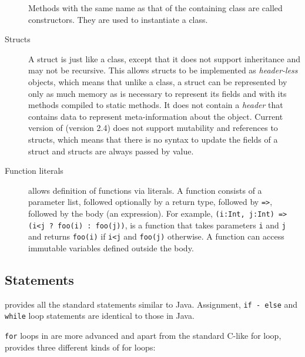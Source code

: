 \begin{description}
Methods with the same name as that of the containing class are called
constructors. They are used to instantiate a class. 

\item[Structs] A struct is just like a class, except that it does not support
inheritance and may not be recursive. This allows structs to be implemented as
\emph{header-less} objects, which means that unlike a class, a struct can be
represented by only as much memory as is necessary to represent its fields and
with its methods compiled to static methods. It does not contain a \emph{header}
that contains data to represent meta-information about the object. Current version
of \xten (version 2.4) does not support mutability and references to structs,
which means that there is no syntax to update the fields of a struct and structs
are always passed by value. 


\item[Function literals] \xten allows definition of functions via literals. A
function consists of a parameter list, followed optionally by a return type,
followed by \texttt{=>}, followed by the body (an expression). For example,
\texttt{(i:Int, j:Int) => (i<j ? foo(i) : foo(j))}, is a function that takes
parameters \texttt{i} and \texttt{j} and returns \texttt{foo(i)} if \texttt{i<j}
and \texttt{foo(j)} otherwise. A function can access immutable variables defined
outside the body.  
 
\end{description}

\subsection{Statements} \xten provides all the standard statements similar to
Java. Assignment, \texttt{if - else} and \texttt{while} loop statements are 
identical to those in Java.

\texttt{for} loops in \xten are more advanced and  apart 
from the standard C-like for loop, \xten
provides three different kinds of for loops:

